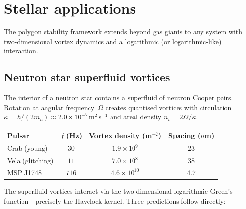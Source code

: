 \section{Stellar applications}
\label{sec:stellar}

The polygon stability framework extends beyond gas giants to any
system with two-dimensional vortex dynamics and a logarithmic
(or logarithmic-like) interaction.

\subsection{Neutron star superfluid vortices}

The interior of a neutron star contains a superfluid of neutron
Cooper pairs.  Rotation at angular frequency~$\Omega$ creates
quantised vortices with circulation
$\kappa = h/(2m_n) \approx 2.0 \times 10^{-7}$\,m$^2$\,s$^{-1}$
and areal density $n_v = 2\Omega/\kappa$.

\begin{center}
\small
\begin{tabular}{lccc}
\toprule
Pulsar & $f$ (Hz) & Vortex density (m$^{-2}$) & Spacing ($\mu$m) \\
\midrule
Crab (young) & $30$ & $1.9 \times 10^9$ & $23$ \\
Vela (glitching) & $11$ & $7.0 \times 10^8$ & $38$ \\
MSP J1748 & $716$ & $4.6 \times 10^{10}$ & $4.7$ \\
\bottomrule
\end{tabular}
\end{center}

\noindent
The superfluid vortices interact via the two-dimensional
logarithmic Green's function---precisely the Havelock kernel.
Three predictions follow directly:


